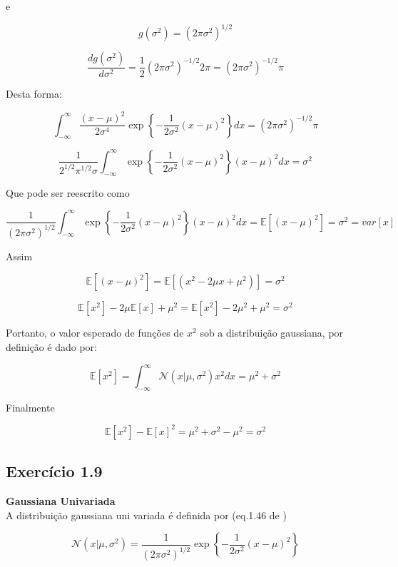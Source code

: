 \documentclass{article}
\begin{document}
    e
    
    \[
    g(\sigma^2) = (2\pi\sigma^{2})^{1/2}
    \]
    
    
    \[
    \frac{ d g(\sigma^2) }{d\sigma^2} = \frac{1}{2} (2\pi\sigma^{2})^{-1/2}2\pi = (2\pi\sigma^{2})^{-1/2}\pi
    \]
    
    Desta forma: 
    
    \[
    \int_{-\infty}^{\infty}\frac{(x-\mu)^{2}}{2\sigma^{4}} \exp\left\{ -\frac{1}{2\sigma^{2}}(x-\mu)^{2}\right\}dx = (2\pi\sigma^{2})^{-1/2}\pi
    \]
    
    
    \[
    \frac{1}{2^{1/2} \pi^{1/2} \sigma}\int_{-\infty}^{\infty} \exp\left\{ -\frac{1}{2\sigma^{2}}(x-\mu)^{2}\right\} (x-\mu)^{2}dx = \sigma^{2}
    \]
    
    Que pode ser reescrito como
    
    \[
    \frac{1}{(2\pi\sigma^{2})^{1/2}}\int_{-\infty}^{\infty}\exp\left\{ -\frac{1}{2\sigma^{2}}(x-\mu)^{2}\right\} (x-\mu)^{2}dx = \mathbb{E}[(x-\mu)^{2}]=\sigma^2=var[x]
    \]
    
    Assim
    
    \[
    \mathbb{E}[(x-\mu)^{2}] = \mathbb{E}[(x^{2}- 2\mu x+\mu^{2})] = \sigma^2
    \]
    
    \[
    \mathbb{E}[x^{2}]- 2\mu \mathbb{E}[x]+\mu^{2} =\mathbb{E}[x^{2}]- 2\mu^2 +\mu^{2}=\sigma^2
    \]
    
    Portanto, o valor esperado de funções de $x^{2}$ sob a distribuição gaussiana, por definição é dado por:
    
    \begin{equation}
    	\mathbb{E}[x^{2}]=\int_{-\infty}^{\infty}\mathcal{N}(x|\mu,\sigma^{2})x^{2}dx = \mu^{2}+\sigma^2
    \end{equation}
    
    Finalmente
    
    \[
    \mathbb{E}[x^2]- \mathbb{E}[x]^2 = \mu^2+\sigma^2-\mu^2 = \sigma^2
    \]
    
    
    
\subsection{ Exerc\'icio 1.9}

 \textbf{Gaussiana Univariada} \\
   A distribuição gaussiana uni variada é definida por (eq.1.46 de \cite{Bishop2006})
  
  \begin{equation}
  	\mathcal{N}(x|\mu,\sigma^{2})=\frac{1}{(2\pi\sigma^{2})^{1/2}}\exp\left\{ -\frac{1}{2\sigma^{2}}(x-\mu)^{2}\right\}                              
  \end{equation}
  
\end{document}
